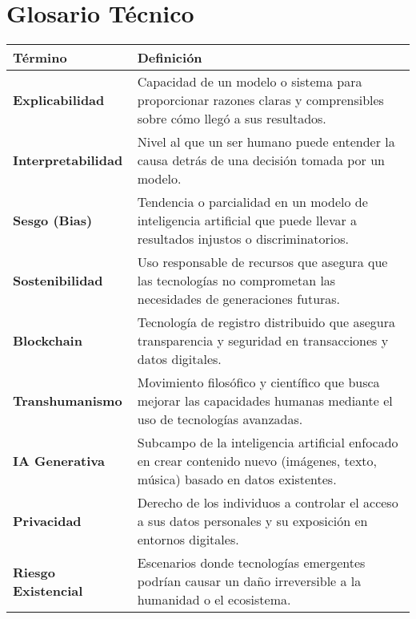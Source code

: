 \section*{Glosario Técnico}

\begin{longtable}{p{3cm}p{9cm}}
    \toprule
    \textbf{Término} & \textbf{Definición} \\
    \midrule\endhead
    \textbf{Explicabilidad} & Capacidad de un modelo o sistema para proporcionar razones claras y comprensibles sobre cómo llegó a sus resultados. \\
    \textbf{Interpretabilidad} & Nivel al que un ser humano puede entender la causa detrás de una decisión tomada por un modelo. \\
    \textbf{Sesgo (Bias)} & Tendencia o parcialidad en un modelo de inteligencia artificial que puede llevar a resultados injustos o discriminatorios. \\
    \textbf{Sostenibilidad} & Uso responsable de recursos que asegura que las tecnologías no comprometan las necesidades de generaciones futuras. \\
    \textbf{Blockchain} & Tecnología de registro distribuido que asegura transparencia y seguridad en transacciones y datos digitales. \\
    \textbf{Transhumanismo} & Movimiento filosófico y científico que busca mejorar las capacidades humanas mediante el uso de tecnologías avanzadas. \\
    \textbf{IA Generativa} & Subcampo de la inteligencia artificial enfocado en crear contenido nuevo (imágenes, texto, música) basado en datos existentes. \\
    \textbf{Privacidad} & Derecho de los individuos a controlar el acceso a sus datos personales y su exposición en entornos digitales. \\
    \textbf{Riesgo Existencial} & Escenarios donde tecnologías emergentes podrían causar un daño irreversible a la humanidad o el ecosistema. \\
    \bottomrule
\end{longtable}
